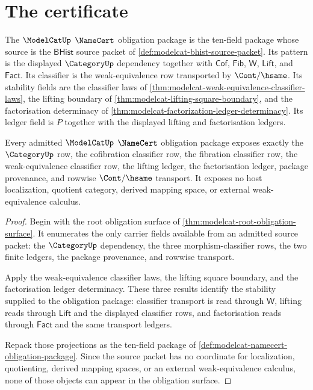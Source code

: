 \section{The certificate}
\label{sec:modelcat-certificate}

\begin{definition}
\label{def:modelcat-namecert-obligation-package}
The $\ModelCatUp$ $\NameCert$ obligation package is the ten-field package whose
source is the $\mathsf{BHist}$ source packet of
\autoref{def:modelcat-bhist-source-packet}. Its pattern is the displayed
$\CategoryUp$ dependency together with $\mathsf{Cof}$, $\mathsf{Fib}$,
$\mathsf{W}$, $\mathsf{Lift}$, and $\mathsf{Fact}$. Its classifier is the
weak-equivalence row transported by $\Cont/\hsame$. Its stability fields are
the classifier laws of
\autoref{thm:modelcat-weak-equivalence-classifier-laws}, the lifting boundary
of \autoref{thm:modelcat-lifting-square-boundary}, and the factorisation
determinacy of
\autoref{thm:modelcat-factorization-ledger-determinacy}. Its ledger field is
$P$ together with the displayed lifting and factorisation ledgers.
\end{definition}

\begin{theorem}
\label{thm:modelcat-namecert-obligation-surface}
Every admitted $\ModelCatUp$ $\NameCert$ obligation package exposes exactly the
$\CategoryUp$ row, the cofibration classifier row, the fibration classifier
row, the weak-equivalence classifier row, the lifting ledger, the
factorisation ledger, package provenance, and rowwise $\Cont/\hsame$
transport. It exposes no host localization, quotient category, derived mapping
space, or external weak-equivalence calculus.
\end{theorem}
\begin{proof}
Begin with the root obligation surface of
\autoref{thm:modelcat-root-obligation-surface}. It enumerates the only carrier
fields available from an admitted source packet: the $\CategoryUp$ dependency,
the three morphism-classifier rows, the two finite ledgers, the package
provenance, and rowwise transport.

Apply the weak-equivalence classifier laws, the lifting square boundary, and
the factorisation ledger determinacy. These three results identify the
stability supplied to the obligation package: classifier transport is read
through $\mathsf{W}$, lifting reads through $\mathsf{Lift}$ and the displayed
classifier rows, and factorisation reads through $\mathsf{Fact}$ and the same
transport ledgers.

Repack those projections as the ten-field package of
\autoref{def:modelcat-namecert-obligation-package}. Since the source packet has
no coordinate for localization, quotienting, derived mapping spaces, or an
external weak-equivalence calculus, none of those objects can appear in the
obligation surface.
\end{proof}

